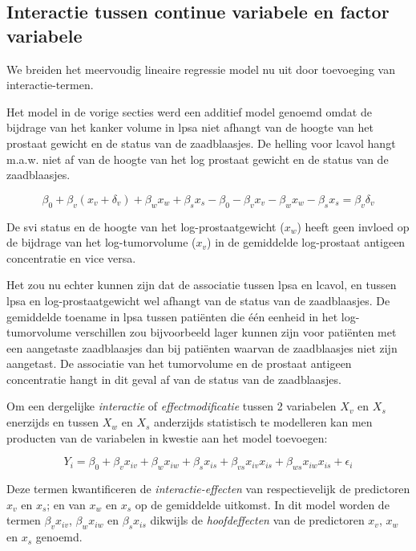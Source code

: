 \documentclass[
  12pt,dutch]{book}
\theoremstyle{definition}
\theoremstyle{definition}
\theoremstyle{definition}
\theoremstyle{definition}
\theoremstyle{remark}
\begin{document}
\subsection{Interactie tussen continue variabele en factor variabele}\label{interactie-tussen-continue-variabele-en-factor-variabele}

We breiden het meervoudig lineaire regressie model nu uit door toevoeging van interactie-termen.

Het model in de vorige secties werd een additief model genoemd omdat de bijdrage van het kanker volume in lpsa niet afhangt van de hoogte van het prostaat gewicht en de status van de zaadblaasjes. De helling voor lcavol hangt m.a.w. niet af van de hoogte van het log prostaat gewicht en de status van de zaadblaasjes.

\[
\beta_0 + \beta_v (x_{v}+\delta_v) + \beta_w x_{w} +\beta_s x_{s} - \beta_0 - \beta_v x_{v} - \beta_w x_{w} -\beta_s x_s = \beta_v \delta_v
\]

De svi status en de hoogte van het log-prostaatgewicht (\(x_w\)) heeft geen invloed op de bijdrage van het log-tumorvolume (\(x_v\)) in de gemiddelde log-prostaat antigeen concentratie en vice versa.

Het zou nu echter kunnen zijn dat de associatie tussen lpsa en lcavol, en tussen lpsa en log-prostaatgewicht wel afhangt van de status van de zaadblaasjes. De gemiddelde toename in lpsa tussen patiënten die één eenheid in het log-tumorvolume verschillen zou bijvoorbeeld lager kunnen zijn voor patiënten met een aangetaste zaadblaasjes dan bij patiënten waarvan de zaadblaasjes niet zijn aangetast. De associatie van het tumorvolume en de prostaat antigeen concentratie hangt in dit geval af van de status van de zaadblaasjes.

Om een dergelijke \textit{interactie} of \textit{effectmodificatie} tussen 2 variabelen \(X_v\) en \(X_s\) enerzijds en tussen \(X_w\) en \(X_s\) anderzijds statistisch te modelleren kan men producten van de variabelen in kwestie aan het model toevoegen:

\[
Y_i = \beta_0 + \beta_v x_{iv} + \beta_w x_{iw} +\beta_s x_{is} + \beta_{vs} x_{iv}x_{is} + \beta_{ws} x_{iw}x_{is} +\epsilon_i
\]

Deze termen kwantificeren de \emph{interactie-effecten} van respectievelijk de predictoren \(x_v\) en \(x_s\); en van \(x_w\) en \(x_s\) op de gemiddelde uitkomst.
In dit model worden de termen \(\beta_vx_{iv}\), \(\beta_wx_{iw}\) en \(\beta_sx_{is}\) dikwijls de \emph{hoofdeffecten} van de predictoren \(x_v\), \(x_w\) en \(x_s\) genoemd.
\end{document}
